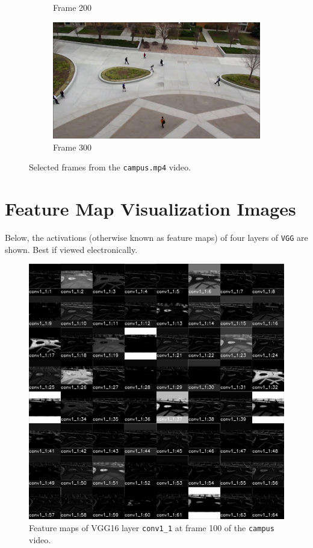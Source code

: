 \documentclass[hidelinks]{article}
\begin{document}
\begin{figure}[h]
\begin{subfigure}{0.49\textwidth}
    \caption{Frame 200}
  \end{subfigure}
  \begin{subfigure}{0.49\textwidth}
    \centering
    \includegraphics[width=\textwidth]{frame_300}
    \caption{Frame 300}
  \end{subfigure}
  
  \caption{Selected frames from the \texttt{campus.mp4} video.}
  \label{fig:campus_frames}
\end{figure}

\newpage
\section{Feature Map Visualization Images} \label{app:fmap}
Below, the activations (otherwise known as feature maps) of four layers of \texttt{VGG} are shown. Best if viewed electronically.

\begin{figure}[H]
  \centering
  \includegraphics[scale=0.23]{acts_conv1_1}
  \caption{Feature maps of VGG16 layer \texttt{conv1\_1} at frame 100 of the \texttt{campus} video.}
  \label{fig:acts_conv1_1}
\end{figure}
\end{document}
